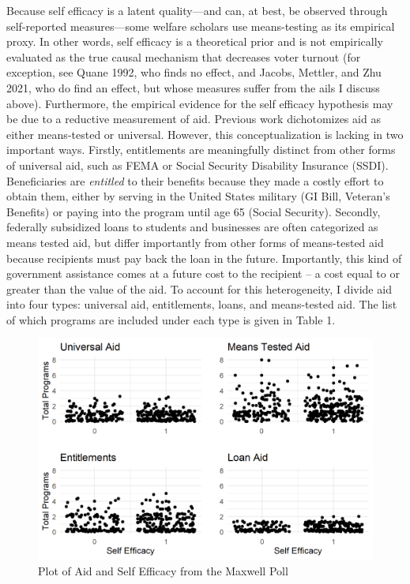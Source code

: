 \documentclass[12pt]{paper}
\begin{document}
Because self efficacy is a latent quality—and can, at best, be observed through self-reported measures—some welfare scholars use means-testing as its empirical proxy. In other words, self efficacy is a theoretical prior and is not empirically evaluated as the true causal mechanism that decreases voter turnout (for exception, see Quane 1992, who finds no effect, and Jacobs, Mettler, and Zhu 2021, who do find an effect, but whose measures suffer from the ails I discuss above). Furthermore, the empirical evidence for the self efficacy hypothesis may be due to a reductive measurement of aid. Previous work dichotomizes aid as either means-tested or universal. However, this conceptualization is lacking in two important ways. Firstly, entitlements are meaningfully distinct from other forms of universal aid, such as FEMA or Social Security Disability Insurance (SSDI). Beneficiaries are \textit{entitled} to their benefits because they made a costly effort to obtain them, either by serving in the United States military (GI Bill, Veteran's Benefits) or paying into the program until age 65 (Social Security). Secondly, federally subsidized loans to students and businesses are often categorized as means tested aid, but differ importantly from other forms of means-tested aid because recipients must pay back the loan in the future. Importantly, this kind of government assistance comes at a future cost to the recipient – a cost equal to or greater than the value of the aid. To account for this heterogeneity, I divide aid into four types: universal aid, entitlements, loans, and means-tested aid. The list of which programs are included under each type is given in Table 1.

\begin{figure} \centering
	\includegraphics[width=.8\linewidth]{Figs/scatter_SE.png}
	\caption{Plot of Aid and Self Efficacy from the Maxwell Poll}
	\label{}
\end{figure}
\end{document}
